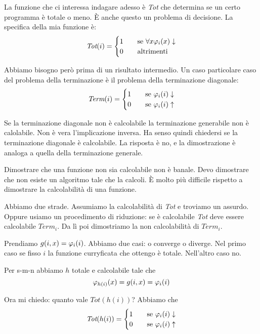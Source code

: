 La funzione che ci interessa indagare adesso è \textit{Tot} che determina se un certo programma è
totale o meno. È anche questo un problema di decisione. La specifica della mia funzione è:
\begin{equation*}
    \textit{Tot}(i) =
    \begin{cases}
        1 \quad &\text{se $\forall x \varphi_{i}(x) \downarrow$} \\
        0 \quad &\text{altrimenti}
    \end{cases}
\end{equation*}

Abbiamo bisogno però prima di un risultato intermedio. Un caso particolare caso del problema della
terminazione è il problema della terminazione diagonale:
\begin{equation*}
    \textit{Term}(i) =
    \begin{cases}
        1 \quad &\text{se $\varphi_{i}(i) \downarrow$} \\
        0 \quad &\text{se $\varphi_{i}(i) \uparrow$} \\
    \end{cases}
\end{equation*}

Se la terminazione diagonale non è calcolabile la terminazione generabile non è calolabile. Non è
vera l'implicazione inversa. Ha senso quindi chiedersi se la terminazione diagonale è calcolabile.
La risposta è no, e la dimostrazione è analoga a quella della terminazione generale.

Dimostrare che una funzione non sia calcolabile non è banale. Devo dimostrare che non esiste un
algoritmo tale che la calcoli. È molto più difficile rispetto a dimostrare la calcolabilità di una
funzione.

Abbiamo due strade. Assumiamo la calcolabilità di \textit{Tot} e troviamo un assurdo. Oppure usiamo
un procedimento di riduzione: se è calcolabile \textit{Tot} deve essere calcolabile
$\textit{Term}_{i}$. Da lì poi dimostriamo la non calcolabilità di $\textit{Term}_{i}$.

Prendiamo $g(i,x) = \varphi_{i}(i)$. Abbiamo due casi: o converge o diverge. Nel primo caso se fisso $i$
la funzione curryficata che ottengo è totale. Nell'altro caso no.

Per s-m-n abbiamo $h$ totale e calcolabile tale che
\begin{equation*}
    \varphi_{h(i)}(x) = g(i,x) = \varphi_{i}(i)
\end{equation*}

Ora mi chiedo: quanto vale $\textit{Tot}(h(i))$? Abbiamo che
\begin{equation*}
    \textit{Tot}(h(i))=
    \begin{cases}
        1 \quad &\text{se $\varphi_{i}(i) \downarrow$} \\
        0 \quad &\text{se $\varphi_{i}(i) \uparrow$}
    \end{cases}
\end{equation*}

